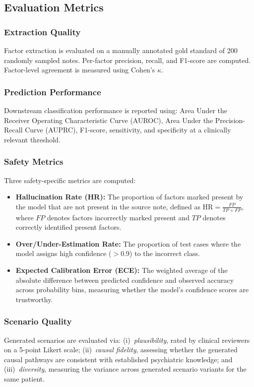 \documentclass[conference]{IEEEtran}
\begin{document}
\subsection{Evaluation Metrics}

\subsubsection{Extraction Quality}
Factor extraction is evaluated on a manually annotated gold standard of 200 randomly sampled notes. Per-factor precision, recall, and F1-score are computed. Factor-level agreement is measured using Cohen's $\kappa$.

\subsubsection{Prediction Performance}
Downstream classification performance is reported using: Area Under the Receiver Operating Characteristic Curve (AUROC), Area Under the Precision-Recall Curve (AUPRC), F1-score, sensitivity, and specificity at a clinically relevant threshold.

\subsubsection{Safety Metrics}
Three safety-specific metrics are computed:
\begin{itemize}
\item \textbf{Hallucination Rate (HR):} The proportion of factors marked present by the model that are not present in the source note, defined as $\text{HR} = \frac{FP}{TP + FP}$, where $FP$ denotes factors incorrectly marked present and $TP$ denotes correctly identified present factors.
\item \textbf{Over/Under-Estimation Rate:} The proportion of test cases where the model assigns high confidence ($>$0.9) to the incorrect class.
\item \textbf{Expected Calibration Error (ECE):} The weighted average of the absolute difference between predicted confidence and observed accuracy across probability bins, measuring whether the model's confidence scores are trustworthy.
\end{itemize}

\subsubsection{Scenario Quality}
Generated scenarios are evaluated via: (i)~\textit{plausibility}, rated by clinical reviewers on a 5-point Likert scale; (ii)~\textit{causal fidelity}, assessing whether the generated causal pathways are consistent with established psychiatric knowledge; and (iii)~\textit{diversity}, measuring the variance across generated scenario variants for the same patient.
\end{document}
